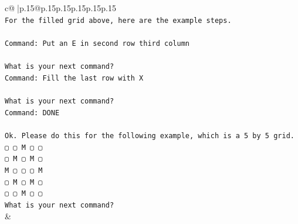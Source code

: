 \documentclass{article}
\begin{document}
{\begin{supertabular}{c@{$\;$}|p{.15\linewidth}@{}p{.15\linewidth}p{.15\linewidth}p{.15\linewidth}p{.15\linewidth}p{.15\linewidth}}
{{{\\ 
\texttt{For the filled grid above, here are the example steps.} \\
\\ 
\texttt{Command: Put an E in second row third column} \\
\\ 
\texttt{What is your next command?} \\
\texttt{Command: Fill the last row with X} \\
\\ 
\texttt{What is your next command?} \\
\texttt{Command: DONE} \\
\\ 
\texttt{Ok. Please do this for the following example, which is a 5 by 5 grid.} \\
\texttt{▢ ▢ M ▢ ▢} \\
\texttt{▢ M ▢ M ▢} \\
\texttt{M ▢ ▢ ▢ M} \\
\texttt{▢ M ▢ M ▢} \\
\texttt{▢ ▢ M ▢ ▢} \\
\texttt{What is your next command?} \\
            }
        }
    }
    & \\ \\


\end{supertabular}}
\end{document}
